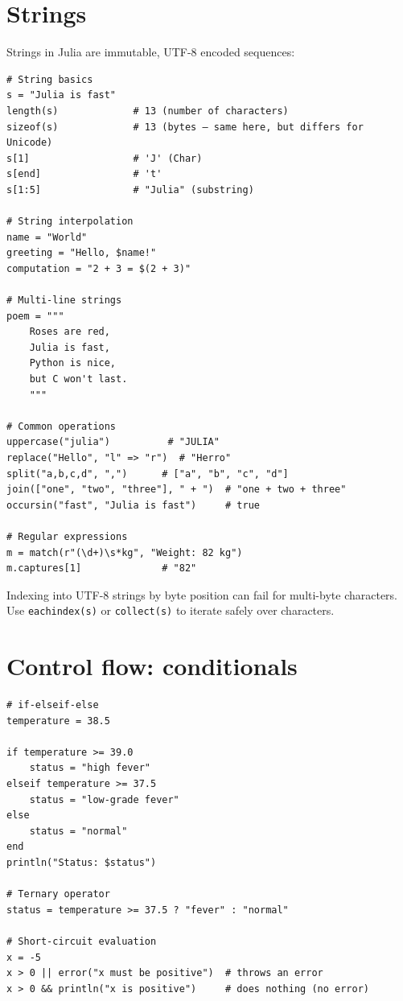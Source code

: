 \section{Strings}

Strings in Julia are immutable, UTF-8 encoded sequences:

\begin{verbatim}
# String basics
s = "Julia is fast"
length(s)             # 13 (number of characters)
sizeof(s)             # 13 (bytes — same here, but differs for Unicode)
s[1]                  # 'J' (Char)
s[end]                # 't'
s[1:5]                # "Julia" (substring)

# String interpolation
name = "World"
greeting = "Hello, $name!"
computation = "2 + 3 = $(2 + 3)"

# Multi-line strings
poem = """
    Roses are red,
    Julia is fast,
    Python is nice,
    but C won't last.
    """

# Common operations
uppercase("julia")          # "JULIA"
replace("Hello", "l" => "r")  # "Herro"
split("a,b,c,d", ",")      # ["a", "b", "c", "d"]
join(["one", "two", "three"], " + ")  # "one + two + three"
occursin("fast", "Julia is fast")     # true

# Regular expressions
m = match(r"(\d+)\s*kg", "Weight: 82 kg")
m.captures[1]              # "82"
\end{verbatim}

\begin{juliatip}
Indexing into UTF-8 strings by byte position can fail for multi-byte characters. Use \texttt{eachindex(s)} or \texttt{collect(s)} to iterate safely over characters.
\end{juliatip}

\section{Control flow: conditionals}

\begin{verbatim}
# if-elseif-else
temperature = 38.5

if temperature >= 39.0
    status = "high fever"
elseif temperature >= 37.5
    status = "low-grade fever"
else
    status = "normal"
end
println("Status: $status")

# Ternary operator
status = temperature >= 37.5 ? "fever" : "normal"

# Short-circuit evaluation
x = -5
x > 0 || error("x must be positive")  # throws an error
x > 0 && println("x is positive")     # does nothing (no error)
\end{verbatim}


